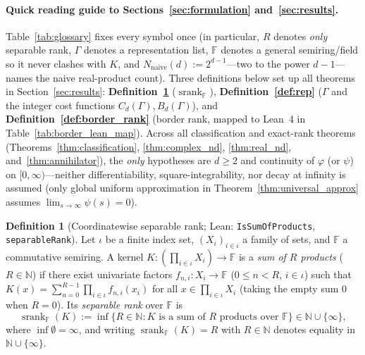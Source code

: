 \documentclass[11pt,a4paper]{article}
\theoremstyle{plain}
\theoremstyle{definition}
\newtheorem{definition}[theorem]{Definition}
\newcommand{\N}{\mathbb{N}}
\newcommand{\Field}{\mathbb{F}}
\newcommand{\Nnaive}{N_{\mathrm{naive}}}
\DeclareMathOperator{\srank}{srank}
\DeclareRobustCommand{\leanid}[1]{{\def\_{\textunderscore\allowbreak}\texttt{#1}}}
\begin{document}
\paragraph{Quick reading guide to Sections~\ref{sec:formulation} and~\ref{sec:results}.}
Table~\ref{tab:glossary} fixes every symbol once (in particular, $R$ denotes \emph{only} separable rank, $\Gamma$ denotes a representation list, $\Field$ denotes a general semiring/field so it never clashes with $K$, and $\Nnaive(d) := 2^{d-1}$---two to the power $d - 1$---names the naive real-product count). Three definitions below set up all theorems in Section~\ref{sec:results}: \textbf{Definition~\ref{def:srank}} ($\srank_{\Field}$), \textbf{Definition~\ref{def:rep}} ($\Gamma$ and the integer cost functions $C_d(\Gamma), B_d(\Gamma)$), and \textbf{Definition~\ref{def:border_rank}} (border rank, mapped to Lean~4 in Table~\ref{tab:border_lean_map}). Across all classification and exact-rank theorems (Theorems~\ref{thm:classification}, \ref{thm:complex_nd}, \ref{thm:real_nd}, and~\ref{thm:annihilator}), the \emph{only} hypotheses are $d \ge 2$ and continuity of $\varphi$ (or $\psi$) on $[0,\infty)$---neither differentiability, square-integrability, nor decay at infinity is assumed (only global uniform approximation in Theorem~\ref{thm:universal_approx} assumes $\lim_{s\to\infty}\psi(s) = 0$).

\begin{definition}[Coordinatewise separable rank; Lean: \leanid{IsSumOfProducts}, \leanid{separableRank}]\label{def:srank}
Let $\iota$ be a finite index set, $(X_i)_{i \in \iota}$ a family of sets, and $\Field$ a commutative semiring. A kernel $K : (\prod_{i \in \iota} X_i) \to \Field$ is a \emph{sum of $R$ products} ($R \in \N$) if there exist univariate factors $f_{n,i} : X_i \to \Field$ ($0 \le n < R$, $i \in \iota$) such that $K(x) = \sum_{n=0}^{R-1} \prod_{i \in \iota} f_{n,i}(x_i)$ for all $x \in \prod_{i \in \iota} X_i$ (taking the empty sum $0$ when $R = 0$). Its \emph{separable rank} over $\Field$ is
\[
  \srank_{\Field}(K) := \inf\bigl\{R \in \N : K \text{ is a sum of } R \text{ products over } \Field\bigr\} \in \N \cup \{\infty\},
\]
where $\inf \emptyset = \infty$, and writing $\srank_{\Field}(K) = R$ with $R \in \N$ denotes equality in $\N \cup \{\infty\}$.
\end{definition}
\end{document}
